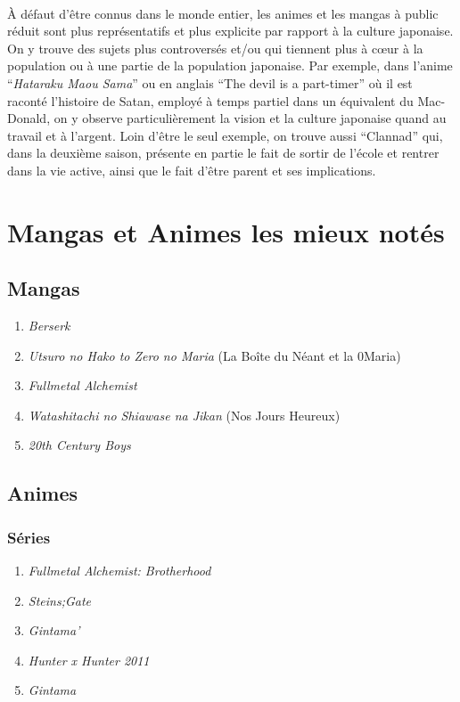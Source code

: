 \paragraph{} À défaut d'être connus dans le monde entier, les animes  et les
mangas à public réduit sont plus représentatifs et plus explicite par rapport à
la culture japonaise. On y trouve des sujets plus controversés et/ou qui
tiennent plus à cœur à la population ou à une partie de la population
japonaise. Par exemple, dans l'anime ``\textit{Hataraku Maou Sama}'' ou en
anglais ``The devil is a part-timer'' où il est raconté l'histoire de Satan,
employé à temps partiel dans un équivalent du Mac-Donald, on y observe
particulièrement la vision et la culture japonaise quand au travail et à
l'argent. Loin d'être le seul exemple, on trouve aussi ``Clannad'' qui, dans la
deuxième saison, présente en partie le fait de sortir de l'école et rentrer
dans la vie active, ainsi que le fait d'être parent et ses implications.

\section[Toplist]{Mangas et Animes les mieux notés}

\subsection{Mangas}

\begin{enumerate}
	\item \emph{Berserk}
	\item \emph{Utsuro no Hako to Zero no Maria} (La Boîte du Néant et la 0\ieme Maria)
	\item \emph{Fullmetal Alchemist}
	\item \emph{Watashitachi no Shiawase na Jikan} (Nos Jours Heureux)
	\item \emph{20th Century Boys}
\end{enumerate}

\subsection{Animes}

\subsubsection{Séries}

\begin{enumerate}
	\item \emph{Fullmetal Alchemist: Brotherhood}
	\item \emph{Steins;Gate}
	\item \emph{Gintama'}
	\item \emph{Hunter x Hunter 2011}
	\item \emph{Gintama\degres}
\end{enumerate}

